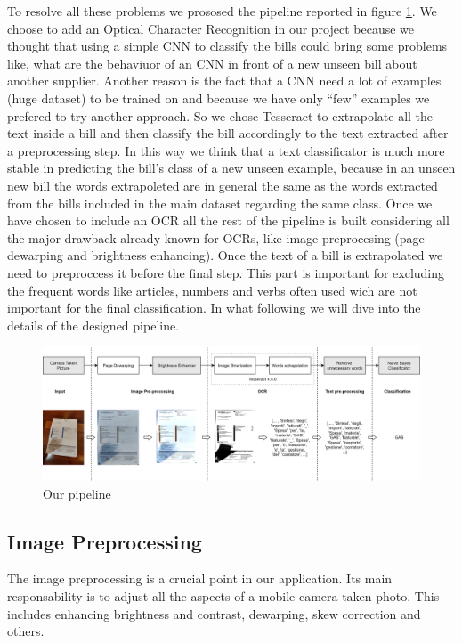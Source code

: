 \documentclass[10pt,twocolumn,letterpaper]{article}
\begin{document}
To resolve all these problems we prososed the pipeline reported in
figure \ref{fig:pipeline}. We choose to add an Optical Character
Recognition in our project because we thought that using a simple CNN
to classify the bills could bring some problems like, what are the
behaviuor of an CNN in front of a new unseen bill about another
supplier. Another reason is the fact that a CNN need a lot of examples
(huge dataset) to be trained on and because we have only ``few''
examples we prefered to try another approach. So we chose Tesseract to
extrapolate all the text inside a bill and then classify the bill
accordingly to the text extracted after a preprocessing step. In this
way we think that a text classificator is much more stable in
predicting the bill's class of a new unseen example, because in an
unseen new bill the words extrapoleted are in general the same as the
words extracted from the bills included in the main dataset regarding the same class. Once we
have chosen to include an OCR all the rest of the pipeline is built
considering all the major drawback already known for OCRs, like image
preprocesing (page dewarping and brightness enhancing). Once the text
of a bill is extrapolated we need to preproccess it before the final
step. This part is important for excluding the frequent words like
articles, numbers and verbs often used wich are not important for the final
classification. In what following we will dive into the details of the
designed pipeline.

\begin{figure}[!ht]
  \centering
  \includegraphics[width=1.0\textwidth]{images/pipeline.png}
  \caption{Our pipeline}
  \label{fig:pipeline}
\end{figure}

\subsection{Image Preprocessing}

The image preprocessing is a crucial point in our application. Its
main responsability is to adjust all the aspects of a mobile camera
taken photo. This includes enhancing brightness and contrast,
dewarping, skew correction and others.
\end{document}
